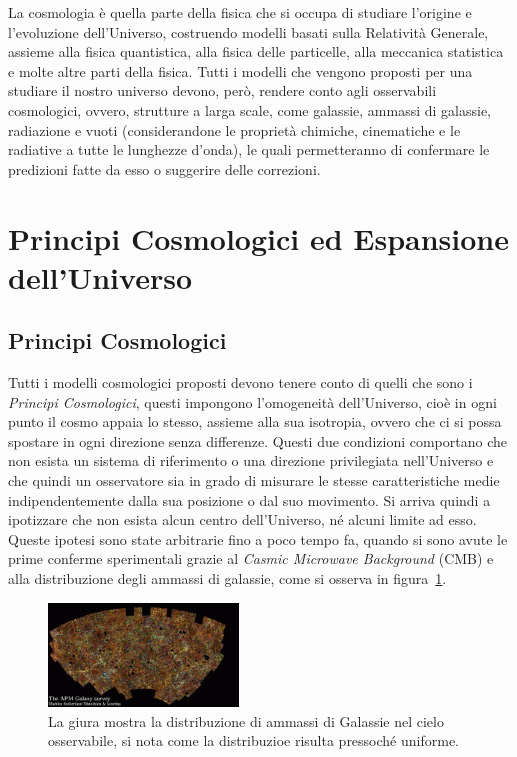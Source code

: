 La cosmologia è quella parte della fisica che si occupa di studiare l'origine e l'evoluzione dell'Universo, costruendo modelli basati sulla Relatività Generale, assieme alla fisica quantistica, alla fisica delle particelle, alla meccanica statistica e molte altre parti della fisica. Tutti i modelli che vengono proposti per una studiare il nostro universo devono, però, rendere conto agli osservabili cosmologici, ovvero, strutture a larga scale, come galassie, ammassi di galassie, radiazione e vuoti (considerandone le proprietà chimiche, cinematiche e le radiative a tutte le lunghezze d'onda), le quali permetteranno di confermare le predizioni fatte da esso o suggerire delle correzioni.
\section{Principi Cosmologici ed Espansione dell'Universo}\label{sec:principi-espansione}
\subsection{Principi Cosmologici}\label{sec:principi-cosmologici}

Tutti i modelli cosmologici proposti devono tenere conto di quelli che sono i \textit{Principi Cosmologici}, questi impongono l'omogeneità dell'Universo, cioè in ogni punto il cosmo appaia lo stesso, assieme alla sua isotropia, ovvero che ci si possa spostare in ogni direzione senza differenze. Questi due condizioni comportano che non esista un sistema di riferimento o una direzione privilegiata nell'Universo e che quindi un osservatore sia in grado di misurare le stesse caratteristiche medie indipendentemente dalla sua posizione o dal suo movimento. Si arriva quindi a ipotizzare che non esista alcun centro dell'Universo, né alcuni limite ad esso. Queste ipotesi sono state arbitrarie fino a poco tempo fa, quando si sono avute le prime conferme sperimentali grazie al \textit{Casmic Microwave Background} (CMB) e alla distribuzione degli ammassi di galassie, come si osserva in figura~\ref{fig:APM}.
\begin{figure}
    \centering
    \includegraphics[width=0.45\textwidth]{immagini/APM.png}
    \caption{La giura mostra la distribuzione di ammassi di Galassie nel cielo osservabile, si nota come la distribuzioe risulta pressoché uniforme.}\label{fig:APM}
\end{figure}
